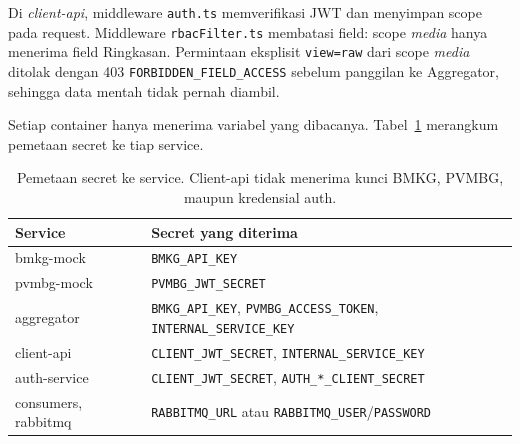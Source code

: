 Di \textit{client-api}, middleware \texttt{auth.ts} memverifikasi JWT dan menyimpan
scope pada request. Middleware \texttt{rbacFilter.ts} membatasi field: scope
\textit{media} hanya menerima field Ringkasan. Permintaan eksplisit \texttt{view=raw}
dari scope \textit{media} ditolak dengan 403 \texttt{FORBIDDEN\_FIELD\_ACCESS} sebelum
panggilan ke Aggregator, sehingga data mentah tidak pernah diambil.

Setiap container hanya menerima variabel yang dibacanya. Tabel~\ref{tab:p3-secret}
merangkum pemetaan secret ke tiap service.

\begin{table}[H]
  \centering
  \small
  \begin{tabularx}{\textwidth}{p{3.4cm}X}
    \toprule
    \textbf{Service} & \textbf{Secret yang diterima} \\
    \midrule
    bmkg-mock & \texttt{BMKG\_API\_KEY} \\
    pvmbg-mock & \texttt{PVMBG\_JWT\_SECRET} \\
    aggregator & \texttt{BMKG\_API\_KEY}, \texttt{PVMBG\_ACCESS\_TOKEN}, \texttt{INTERNAL\_SERVICE\_KEY} \\
    client-api & \texttt{CLIENT\_JWT\_SECRET}, \texttt{INTERNAL\_SERVICE\_KEY} \\
    auth-service & \texttt{CLIENT\_JWT\_SECRET}, \texttt{AUTH\_*\_CLIENT\_SECRET} \\
    consumers, rabbitmq & \texttt{RABBITMQ\_URL} atau \texttt{RABBITMQ\_USER}/\texttt{PASSWORD} \\
    \bottomrule
  \end{tabularx}
  \caption{Pemetaan secret ke service. Client-api tidak menerima kunci BMKG, PVMBG, maupun kredensial auth.}
  \label{tab:p3-secret}
\end{table}

